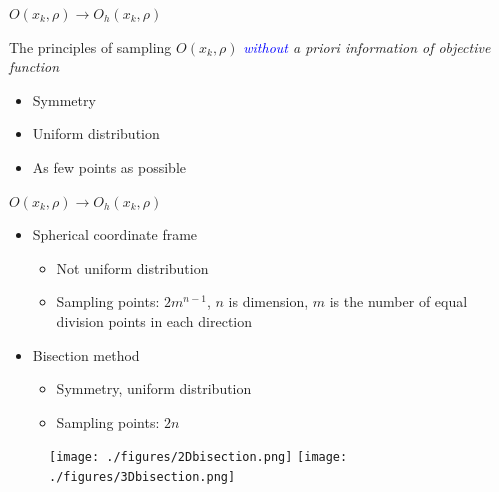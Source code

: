 \documentclass{beamer}
\begin{document}
\begin{frame}{$O(x_k, \rho)\rightarrow O_h(x_k, \rho)$}

The principles of sampling $O(x_k,\rho)$
\textit{\textcolor{blue}{without} a priori information of objective function}
\begin{itemize}
	\item Symmetry
	\item Uniform distribution
	\item As few points as possible
\end{itemize}

\end{frame}

\begin{frame}{$O(x_k, \rho)\rightarrow O_h(x_k, \rho)$}

	\begin{itemize}
		\item Spherical coordinate frame
		\begin{itemize}
			\item Not uniform distribution
			\item Sampling points: $2m^{n-1}$, $n$ is dimension,
				$m$ is the number of equal division points in
				each direction
		\end{itemize}
	\end{itemize}

	\begin{itemize}
		\item Bisection method
		\begin{itemize}
			\item Symmetry, uniform distribution
			\item Sampling points: $2n$
		\end{itemize}
	\end{itemize}
\begin{figure}[!htbp]
	\centering
	  \texttt{[image: ./figures/2Dbisection.png]}
	  \hspace{1cm}
	  \texttt{[image: ./figures/3Dbisection.png]}
\label{fig:gauss:2drand}
\end{figure}
\end{frame}
\end{document}
